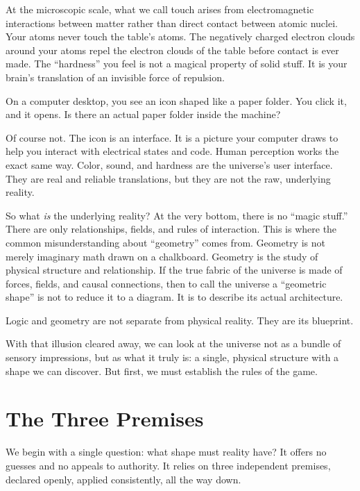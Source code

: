 \documentclass[11pt]{article}
\theoremstyle{canonstyle}
\begin{document}
At the microscopic scale, what we call touch arises from electromagnetic interactions between matter rather than direct contact between atomic nuclei. Your atoms never touch the table's atoms. The negatively charged electron clouds around your atoms repel the electron clouds of the table before contact is ever made. The ``hardness'' you feel is not a magical property of solid stuff. It is your brain's translation of an invisible force of repulsion. 

\begin{reflect}
On a computer desktop, you see an icon shaped like a paper folder. You click it, and it opens. Is there an actual paper folder inside the machine?
\end{reflect}

Of course not. The icon is an interface. It is a picture your computer draws to help you interact with electrical states and code. Human perception works the exact same way. Color, sound, and hardness are the universe's user interface. They are real and reliable translations, but they are not the raw, underlying reality.

So what \emph{is} the underlying reality? At the very bottom, there is no ``magic stuff.'' There are only relationships, fields, and rules of interaction. This is where the common misunderstanding about ``geometry'' comes from. Geometry is not merely imaginary math drawn on a chalkboard. Geometry is the study of physical structure and relationship. If the true fabric of the universe is made of forces, fields, and causal connections, then to call the universe a ``geometric shape'' is not to reduce it to a diagram. It is to describe its actual architecture.

\begin{keyresult}
Logic and geometry are not separate from physical reality. They are its blueprint.
\end{keyresult}

With that illusion cleared away, we can look at the universe not as a bundle of sensory impressions, but as what it truly is: a single, physical structure with a shape we can discover. But first, we must establish the rules of the game.

\newpage

\section{The Three Premises}

We begin with a single question: what shape must reality have? It offers no guesses and no appeals to authority. It relies on three independent premises, declared openly, applied consistently, all the way down.
\end{document}
